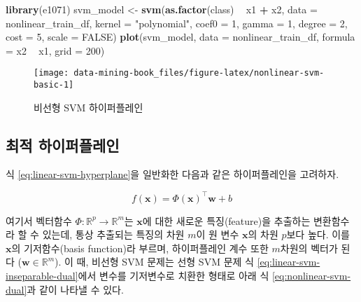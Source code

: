 \documentclass[]{book}
\newenvironment{Shaded}{\begin{snugshade}}{\end{snugshade}}
\newcommand{\DataTypeTok}[1]{\textcolor[rgb]{0.13,0.29,0.53}{#1}}
\newcommand{\DecValTok}[1]{\textcolor[rgb]{0.00,0.00,0.81}{#1}}
\newcommand{\KeywordTok}[1]{\textcolor[rgb]{0.13,0.29,0.53}{\textbf{#1}}}
\newcommand{\NormalTok}[1]{#1}
\newcommand{\OperatorTok}[1]{\textcolor[rgb]{0.81,0.36,0.00}{\textbf{#1}}}
\newcommand{\OtherTok}[1]{\textcolor[rgb]{0.56,0.35,0.01}{#1}}
\newcommand{\StringTok}[1]{\textcolor[rgb]{0.31,0.60,0.02}{#1}}
\begin{document}
\begin{Shaded}
\begin{Highlighting}[]
\KeywordTok{library}\NormalTok{(e1071)}
\NormalTok{svm_model <-}\StringTok{ }\KeywordTok{svm}\NormalTok{(}\KeywordTok{as.factor}\NormalTok{(class) }\OperatorTok{~}\StringTok{ }\NormalTok{x1 }\OperatorTok{+}\StringTok{ }\NormalTok{x2, }\DataTypeTok{data =}\NormalTok{ nonlinear_train_df, }
                 \DataTypeTok{kernel =} \StringTok{"polynomial"}\NormalTok{, }\DataTypeTok{coef0 =} \DecValTok{1}\NormalTok{, }\DataTypeTok{gamma =} \DecValTok{1}\NormalTok{, }\DataTypeTok{degree =} \DecValTok{2}\NormalTok{,}
                 \DataTypeTok{cost =} \DecValTok{5}\NormalTok{, }\DataTypeTok{scale =} \OtherTok{FALSE}\NormalTok{)}
\KeywordTok{plot}\NormalTok{(svm_model, }\DataTypeTok{data =}\NormalTok{ nonlinear_train_df, }\DataTypeTok{formula =}\NormalTok{ x2 }\OperatorTok{~}\StringTok{ }\NormalTok{x1, }\DataTypeTok{grid =} \DecValTok{200}\NormalTok{)}
\end{Highlighting}
\end{Shaded}

\begin{figure}

{\centering \texttt{[image: data-mining-book\_files/figure-latex/nonlinear-svm-basic-1]} 

}

\caption{비선형 SVM 하이퍼플레인}\label{fig:nonlinear-svm-basic}
\end{figure}

\hypertarget{nonlinear-svm-hyperplane}{%
\subsection{최적 하이퍼플레인}\label{nonlinear-svm-hyperplane}}

식 \eqref{eq:linear-svm-hyperplane}을 일반화한 다음과 같은 하이퍼플레인을 고려하자.

\begin{equation}
f(\mathbf{x}) = \Phi(\mathbf{x})^\top \mathbf{w} + b \label{eq:nonlinear-svm-hyperplane}
\end{equation}

여기서 벡터함수 \(\Phi: \mathbb{R}^p \rightarrow \mathbb{R}^m\)는 \(\mathbf{x}\)에 대한 새로운 특징(feature)을 추출하는 변환함수라 할 수 있는데, 통상 추출되는 특징의 차원 \(m\)이 원 변수 \(\mathbf{x}\)의 차원 \(p\)보다 높다. 이를 \(\mathbf{x}\)의 기저함수(basis function)라 부르며, 하이퍼플레인 계수 또한 \(m\)차원의 벡터가 된다 (\(\mathbf{w} \in \mathbb{R}^m\)). 이 때, 비선형 SVM 문제는 선형 SVM 문제 식 \eqref{eq:linear-svm-inseparable-dual}에서 변수를 기저변수로 치환한 형태로 아래 식 \eqref{eq:nonlinear-svm-dual}과 같이 나타낼 수 있다.
\end{document}
